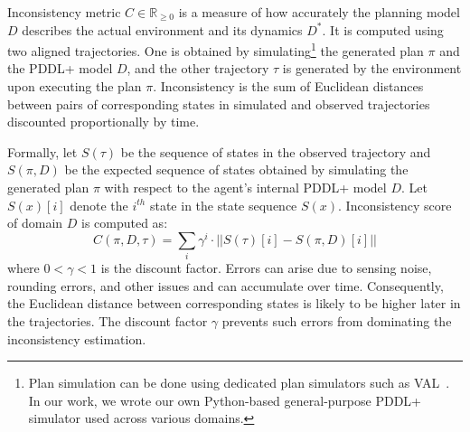 \documentclass[letterpaper]{article} %
\begin{document}
Inconsistency metric $C \in \mathbb{R}_{\ge 0}$ is a measure of how accurately the planning model $D$ describes the actual environment and its dynamics $D^*$. It is computed using two aligned trajectories. One is obtained by simulating\footnote{Plan simulation can be done using dedicated plan simulators such as VAL~\cite{howey2004val}. In our work, we wrote our own Python-based general-purpose PDDL+ simulator used across various domains.} the generated plan $\pi$ and the PDDL+ model $D$, and the other trajectory $\tau$ is generated by the environment upon executing the plan $\pi$. Inconsistency is the sum of Euclidean distances between pairs of corresponding states in simulated and observed trajectories discounted proportionally by time.


Formally, let $S(\tau)$ be the sequence of states in the observed trajectory and $S(\pi,D)$ be the expected sequence of states obtained by simulating the generated plan $\pi$ with respect to the agent's internal PDDL+ model $D$. Let $S(x)[i]$ denote the $i^{th}$ state in the state sequence $S(x)$. Inconsistency score of domain $D$ is computed as:
\begin{equation}
    C(\pi, D, \tau) = \sum_{i} \gamma^i\cdot ||S(\tau)[i] - S(\pi,D)[i]||
\end{equation}
where $0<\gamma<1$ is the discount factor. Errors can arise due to sensing noise, rounding errors, and other issues and can accumulate over time. Consequently, the Euclidean distance between corresponding states is likely to be higher later in the trajectories. The discount factor $\gamma$ prevents such errors from dominating the inconsistency estimation.
\end{document}
